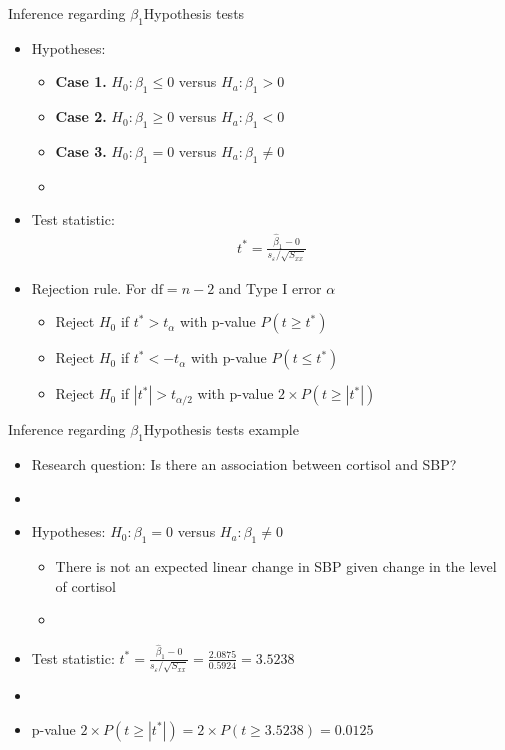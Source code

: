 \documentclass[xcolor=dvipsnames]{beamer}
\begin{document}
\begin{frame}{Inference regarding $\beta_1$}{Hypothesis tests}
	\begin{itemize}
		\item Hypotheses:
		\begin{itemize}
			\item \textbf{Case 1.} $H_0: \beta_1 \leq 0$ versus $H_a: \beta_1 > 0$
			\item \textbf{Case 2.} $H_0: \beta_1 \geq 0$ versus $H_a: \beta_1 < 0$
			\item \textbf{Case 3.} $H_0: \beta_1 = 0$ versus $H_a: \beta_1 \neq 0$
			\item[]
		\end{itemize}
	\item Test statistic:
	\begin{gather*}
		t^*=\frac{\hat{\beta}_1-0}{s_{\varepsilon} / \sqrt{S_{xx}}}
	\end{gather*}
	\item Rejection rule. For $\text{df} = n-2$ and Type I error $\alpha$
	\begin{itemize}
		\item Reject $H_0$ if $t^* > t_{\alpha}$ with p-value $P(t \geq t^*)$
		\item Reject $H_0$ if $t^* < -t_{\alpha}$ with p-value $P(t \leq t^*)$
		\item Reject $H_0$ if $|t^*| > t_{\alpha / 2}$ with p-value $2\times P(t \geq |t^*|)$
	\end{itemize}
	\end{itemize}
\end{frame}

\begin{frame}{Inference regarding $\beta_1$}{Hypothesis tests example}
	\begin{itemize}
		\item Research question: Is there an association between cortisol and SBP?
		\item[]
		\item Hypotheses: $H_0: \beta_1 = 0$ versus $H_a: \beta_1 \neq 0$
		\begin{itemize}
			\item There is not an expected linear change in SBP given change in the level of cortisol
			\item[]
		\end{itemize}
		\item Test statistic: $t^*=\frac{\hat{\beta}_1-0}{s_{\varepsilon} / \sqrt{S_{xx}}}= \frac{2.0875}{0.5924}=3.5238$
		\item[]
		\item p-value $2\times P(t \geq |t^*|) = 2 \times P(t \geq 3.5238) = 0.0125$
	\end{itemize}
\end{frame}
\end{document}
